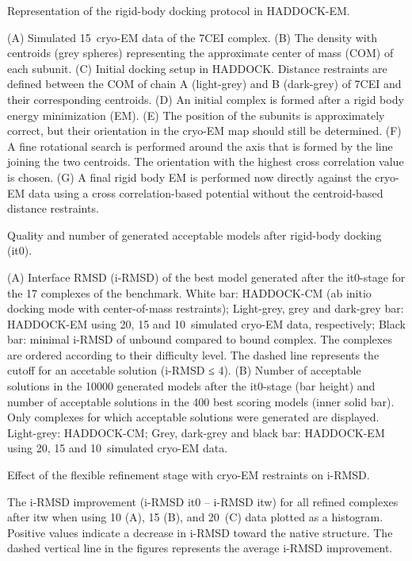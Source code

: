 \caption{Representation of the rigid-body docking protocol in HADDOCK-EM.} 
{(A) Simulated 15\Angstrom\ cryo-EM data of the 7CEI complex. 
(B) The density with centroids (grey spheres) representing the approximate
center of mass (COM) of each subunit. 
(C) Initial docking setup in HADDOCK. Distance restraints are defined between
the COM of chain A (light-grey) and B (dark-grey) of 7CEI and their
corresponding centroids. 
(D) An initial complex is formed after a rigid body energy minimization (EM). 
(E) The position of the subunits is approximately correct, but their
orientation in the cryo-EM map should still be determined. 
(F) A fine rotational search is performed around the axis that is formed by the
line joining the two centroids. 
The orientation with the highest cross correlation value is chosen. 
(G) A final rigid body EM is performed now directly against the cryo-EM data
using a cross correlation-based potential without the centroid-based distance
restraints.}
\stopbuffer


\caption{Quality and number of generated acceptable models after rigid-body
docking (it0).}
{(A) Interface RMSD (i-RMSD) of the best model generated after the it0-stage
for the 17 complexes of the benchmark. White bar: HADDOCK-CM (ab initio docking
mode with center-of-mass restraints); Light-grey, grey and dark-grey bar:
HADDOCK-EM using 20, 15 and 10\Angstrom\ simulated cryo-EM data, respectively; Black
bar: minimal i-RMSD of unbound compared to bound complex. The complexes are
ordered according to their difficulty level. The dashed line represents the
cutoff for an accetable solution (i-RMSD ≤ 4\Angstrom).
(B) Number of acceptable solutions in the 10000 generated models after the
it0-stage (bar height) and number of acceptable solutions in the 400 best
scoring models (inner solid bar). Only complexes for which acceptable solutions
were generated are displayed. Light-grey: HADDOCK-CM; Grey, dark-grey and black
bar: HADDOCK-EM using 20, 15 and 10\Angstrom\ simulated cryo-EM data.}
\stopbuffer
        

\caption{Effect of the flexible refinement stage with cryo-EM restraints on i-RMSD.}
{The i-RMSD improvement (i-RMSD it0 – i-RMSD itw) for all refined complexes
after itw when using 10 (A), 15 (B), and 20\Angstrom\ (C) data plotted as a histogram. 
Positive values indicate a decrease in i-RMSD toward the native structure. The
dashed vertical line in the figures represents the average i-RMSD improvement.}
\stopbuffer


